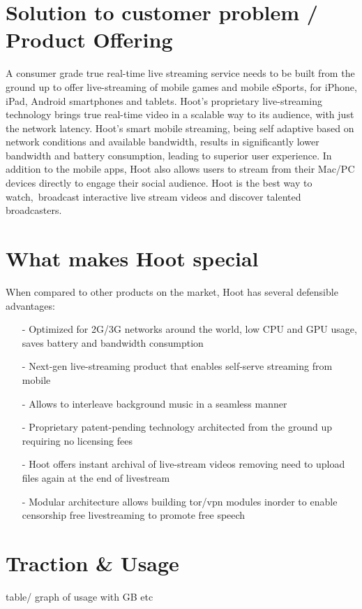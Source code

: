 \documentclass{article}
\begin{document}
\section{Solution to customer problem / Product Offering}
A consumer grade true real-time live streaming service needs to be
built from the ground up to offer live-streaming of mobile games and
mobile eSports, for iPhone, iPad, Android smartphones and
tablets. Hoot's proprietary live-streaming technology brings true real-time video in a scalable way to its audience, with just the network latency. Hoot's smart mobile streaming, being self adaptive based on network conditions and available bandwidth, results in significantly lower bandwidth and battery consumption, leading to superior user experience. In addition to the mobile apps, Hoot also allows users to stream from their Mac/PC devices directly to engage their social audience. Hoot is the best way to watch, broadcast interactive live stream videos and discover talented broadcasters.

\section{What makes Hoot special}
When compared to other products on the market, Hoot has several defensible advantages:
\begin{itemize}
\item[-]Optimized for 2G/3G networks around the world, low CPU and GPU usage, saves battery and bandwidth consumption
\item[-]Next-gen live-streaming product that enables self-serve streaming from mobile
\item[-]Allows to interleave background music in a seamless manner
\item[-]Proprietary patent-pending technology architected from the
  ground up requiring no licensing fees
\item[-]Hoot offers instant archival of live-stream videos removing
  need to upload files again at the end of livestream
\item[-]Modular architecture allows building tor/vpn modules inorder
  to enable censorship free livestreaming to promote free speech
\end{itemize}


\section{Traction \& Usage}
table/ graph of usage with GB etc
\end{document}
